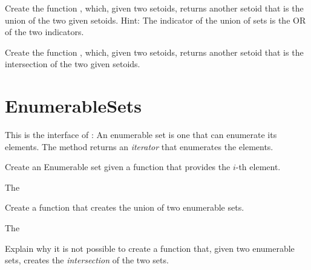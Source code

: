 \begin{exercise}
  Create the function , which, given two setoids, returns another setoid that is the union of the two given setoids.
%
%
  Hint: The indicator of the union of sets is the OR of the two indicators.
\end{exercise}

\begin{exercise}
  Create the function , which, given two setoids, returns another setoid that is the intersection of the two given setoids.
%
\end{exercise}


\section{EnumerableSets}

This is the interface of :
%
%
An enumerable set is one that can enumerate its elements.
The method  returns an \emph{iterator} that enumerates the elements.

\begin{exercise}
  Create an Enumerable set given a function that provides the $i$-th element.

  The
%
\end{exercise}

\begin{exercise}
  Create a function that creates the union of two enumerable sets.

  The
%
\end{exercise}

\begin{exercise}
  Explain why it is not possible to create a function that, given two enumerable sets,
  creates the \emph{intersection} of the two sets.
\end{exercise}


